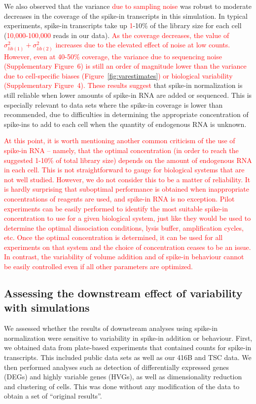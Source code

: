 \documentclass{article}
\newcommand{\suppfigcell}{4}
\newcommand{\suppfignoise}{6}
\newcommand{\revised}[1]{\textcolor{red}{#1}}
\begin{document}
We also observed that the variance \revised{due to sampling noise} was robust to moderate decreases in the coverage of the spike-in transcripts in this simulation.
In typical experiments, spike-in transcripts take up \revised{1}-10\% of the library size for each cell (\revised{10,000-100,000} reads in our data).
\revised{As the coverage decreases, the value of $\sigma^2_{lib(1)} + \sigma^2_{lib(2)}$ increases due to the elevated effect of noise at low counts.
However, even at 40-50\% coverage, the variance due to sequencing noise (Supplementary Figure~\suppfignoise{}) is still an order of magnitude lower than the variance due to cell-specific biases (Figure~\ref{fig:varestimates}) or biological variability (Supplementary Figure~\suppfigcell{}).
These results suggest} that spike-in normalization is still reliable when lower amounts of spike-in RNA are added or sequenced.
This is especially relevant to data sets where the spike-in coverage is lower than recommended, due to difficulties in determining the appropriate concentration of spike-ins to add to each cell when the quantity of endogenous RNA is unknown.

\revised{At this point, it is worth mentioning another common criticism of the use of spike-in RNA -- namely, that the optimal concentration (in order to reach the suggested 1-10\% of total library size) depends on the amount of endogenous RNA in each cell.
This is not straightforward to gauge for biological systems that are not well studied.
However, we do not consider this to be a matter of reliability.
It is hardly surprising that suboptimal performance is obtained when inappropriate concentrations of reagents are used, and spike-in RNA is no exception.
Pilot experiments can be easily performed to identify the most suitable spike-in concentration to use for a given biological system, just like they would be used to determine the optimal dissociation conditions, lysis buffer, amplification cycles, etc.
Once the optimal concentration is determined, it can be used for all experiments on that system and the choice of concentration ceases to be an issue.
In contrast, the variability of volume addition and of spike-in behaviour cannot be easily controlled even if all other parameters are optimized. 
}

\subsection*{Assessing the downstream effect of variability with simulations}
We assessed whether the results of downstream analyses using spike-in normalization were sensitive to variability in spike-in addition or behaviour.
First, we obtained data from plate-based experiments that contained counts for spike-in transcripts.
This included public data sets \citep{segerstople2016single,islam2011characterization} as well as our 416B and TSC data.
We then performed analyses such as detection of differentially expressed genes (DEGs) and highly variable genes (HVGs), as well as dimensionality reduction and clustering of cells.
This was done without any modification of the data to obtain a set of ``original results''.
\end{document}
